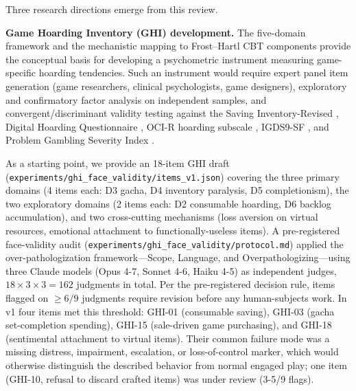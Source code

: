\documentclass[12pt]{article}
\begin{document}
Three research directions emerge from this review.

\textbf{Game Hoarding Inventory (GHI) development.} The five-domain framework and the mechanistic mapping to Frost--Hartl CBT components provide the conceptual basis for developing a psychometric instrument measuring game-specific hoarding tendencies. Such an instrument would require expert panel item generation (game researchers, clinical psychologists, game designers), exploratory and confirmatory factor analysis on independent samples, and convergent/discriminant validity testing against the Saving Inventory-Revised \citep{Frost2004}, Digital Hoarding Questionnaire \citep{Neave2019}, OCI-R hoarding subscale \citep{Foa2002}, IGDS9-SF \citep{Pontes2015}, and Problem Gambling Severity Index \citep{Ferris2001}.

As a starting point, we provide an 18-item GHI draft (\texttt{experiments/ghi\_face\_validity/items\_v1.json}) covering the three primary domains (4 items each: D3 gacha, D4 inventory paralysis, D5 completionism), the two exploratory domains (2 items each: D2 consumable hoarding, D6 backlog accumulation), and two cross-cutting mechanisms (loss aversion on virtual resources, emotional attachment to functionally-useless items). A pre-registered face-validity audit (\texttt{experiments/ghi\_face\_validity/protocol.md}) applied the \citet{King2020} over-pathologization framework---Scope, Language, and Overpathologizing---using three Claude models (Opus 4-7, Sonnet 4-6, Haiku 4-5) as independent judges, $18 \times 3 \times 3 = 162$ judgments in total. Per the pre-registered decision rule, items flagged on $\geq 6/9$ judgments require revision before any human-subjects work. In v1 four items met this threshold: GHI-01 (consumable saving), GHI-03 (gacha set-completion spending), GHI-15 (sale-driven game purchasing), and GHI-18 (sentimental attachment to virtual items). Their common failure mode was a missing distress, impairment, escalation, or loss-of-control marker, which would otherwise distinguish the described behavior from normal engaged play; one item (GHI-10, refusal to discard crafted items) was under review (3-5/9 flags).
\end{document}

